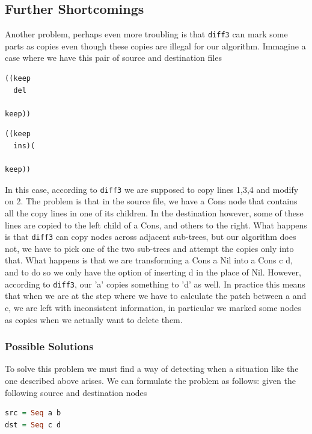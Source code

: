 \documentclass[11pt]{article}
\begin{document}
\subsection{Further Shortcomings}

Another problem, perhaps even more troubling is that \texttt{diff3} can mark 
some parts as copies even though these copies are illegal for our algorithm.
Immagine a case where we have this pair of source and destination files

\begin{lstlisting}[language=haskell]
((keep
  del

keep))
\end{lstlisting}

\begin{lstlisting}[language=haskell]
((keep
  ins)(

keep))
\end{lstlisting}

In this case, according to \texttt{diff3} we are supposed to copy lines 1,3,4 
and modify on 2. The problem is that in the source file, we have a Cons node 
that contains all the copy lines in one of its children. In the destination 
however, some of these lines are copied to the left child of a Cons, and others 
to the right. What happens is that \texttt{diff3} can copy nodes across adjacent sub-trees, 
but our algorithm does not, we have to pick one of the two sub-trees and attempt 
the copies only into that.
What happens is that we are transforming a Cons a Nil into a Cons c d, and to do 
so we only have the option of inserting d in the place of Nil. However, 
according to \texttt{diff3}, our 'a' copies something to 'd' as well. In practice 
this means that when we are at the step where we have to calculate the patch between 
a and c, we are left with inconsistent information, in particular we marked some nodes as copies when we
actually want to delete them.

\subsubsection{Possible Solutions}

To solve this problem we must find a way of detecting when a situation like the 
one described above arises. We can formulate the problem as follows:
given the following source and destination nodes

\begin{lstlisting}[language=haskell]
src = Seq a b
dst = Seq c d
\end{lstlisting}
\end{document}
